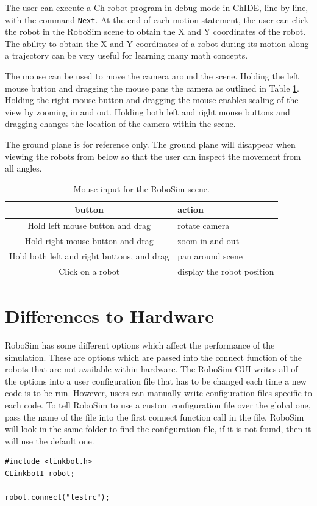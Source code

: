 \documentclass{article}
\begin{document}
The user can execute a Ch robot program in debug mode in ChIDE, line by line,
with the command {\tt Next}. At the end of each motion statement, the user can
click the robot in the RoboSim scene to obtain the X and Y coordinates of the
robot.  The ability to obtain the X and Y coordinates of a robot during its
motion along a trajectory can be very useful for learning many math concepts.

The mouse can be used to move the camera around the scene.  Holding the left
mouse button and dragging the mouse pans the camera as outlined in Table
\ref{tab:buttons}.  Holding the right mouse button and dragging the mouse
enables scaling of the view by zooming in and out.  Holding both left and right
mouse buttons and dragging changes the location of the camera within the scene.

The ground plane is for reference only.  The ground plane will disappear when
viewing the robots from below so that the user can inspect the movement from all
angles.

\begin{table}[H]
	\begin{center}
	\begin{tabular}{c | l }
		\hline \hline
		\textbf{button} & \textbf{action} \\ \hline
		Hold left mouse button and drag& rotate camera \\
		Hold right mouse button and drag& zoom in and out \\
		Hold both left and right buttons,  and drag & pan around scene \\
		Click on a robot & display the robot position\\
		\hline \hline
	\end{tabular}
	\caption{Mouse input for the RoboSim scene.}
	\label{tab:buttons}
	\end{center}
\end{table}

\section{Differences to Hardware}
RoboSim has some different options which affect the performance of the
simulation.  These are options which are passed into the connect function of the
robots that are not available within hardware.  The RoboSim GUI writes all of
the options into a user configuration file that has to be changed each time a
new code is to be run.  However, users can manually write configuration files
specific to each code.  To tell RoboSim to use a custom configuration file over
the global one, pass the name of the file into the first connect function call
in the file.  RoboSim will look in the same folder to find the configuration
file, if it is not found, then it will use the default one.
\begin{verbatim}
#include <linkbot.h>
CLinkbotI robot;

robot.connect("testrc");
\end{verbatim}
\end{document}
